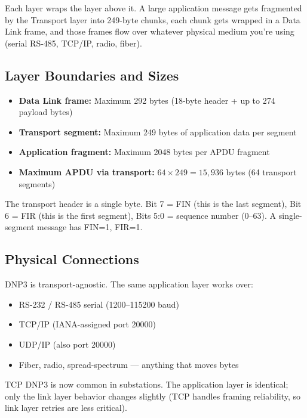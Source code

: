 \documentclass[11pt,twoside]{article}
\begin{document}
Each layer wraps the layer above it. A large application message gets fragmented by the Transport layer into 249-byte chunks, each chunk gets wrapped in a Data Link frame, and those frames flow over whatever physical medium you're using (serial RS-485, TCP/IP, radio, fiber).

\subsection{Layer Boundaries and Sizes}

\begin{itemize}[noitemsep]
  \item \textbf{Data Link frame:} Maximum 292 bytes (18-byte header + up to 274 payload bytes)
  \item \textbf{Transport segment:} Maximum 249 bytes of application data per segment
  \item \textbf{Application fragment:} Maximum 2048 bytes per APDU fragment
  \item \textbf{Maximum APDU via transport:} $64 \times 249 = 15{,}936$ bytes (64 transport segments)
\end{itemize}

\begin{specbox}
The transport header is a single byte. Bit 7 = FIN (this is the last segment), Bit 6 = FIR (this is the first segment), Bits 5:0 = sequence number (0--63). A single-segment message has FIN=1, FIR=1.
\end{specbox}

\subsection{Physical Connections}

DNP3 is transport-agnostic. The same application layer works over:
\begin{itemize}[noitemsep]
  \item RS-232 / RS-485 serial (1200--115200 baud)
  \item TCP/IP (IANA-assigned port 20000)
  \item UDP/IP (also port 20000)
  \item Fiber, radio, spread-spectrum --- anything that moves bytes
\end{itemize}

TCP DNP3 is now common in substations. The application layer is identical; only the link layer behavior changes slightly (TCP handles framing reliability, so link layer retries are less critical).
\end{document}
